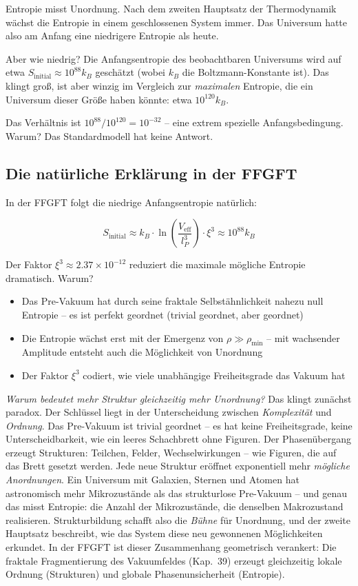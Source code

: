 	Entropie misst Unordnung. Nach dem zweiten Hauptsatz der Thermodynamik wächst die Entropie in einem geschlossenen System immer. Das Universum hatte also am Anfang eine niedrigere Entropie als heute.
	
	Aber wie niedrig? Die Anfangsentropie des beobachtbaren Universums wird auf etwa $S_{\text{initial}} \approx 10^{88} k_B$ geschätzt (wobei $k_B$ die Boltzmann-Konstante ist). Das klingt groß, ist aber winzig im Vergleich zur \textit{maximalen} Entropie, die ein Universum dieser Größe haben könnte: etwa $10^{120} k_B$.
	
	Das Verhältnis ist $10^{88}/10^{120} = 10^{-32}$ -- eine extrem spezielle Anfangsbedingung. Warum? Das Standardmodell hat keine Antwort.
	
	\subsection{Die natürliche Erklärung in der FFGFT}
	
	In der FFGFT folgt die niedrige Anfangsentropie natürlich:
	
	\begin{equation}
		S_{\text{initial}} \approx k_B \cdot \ln\left(\frac{V_{\text{eff}}}{l_P^3}\right) \cdot \xi^3 \approx 10^{88} k_B
	\end{equation}
	
	Der Faktor $\xi^3 \approx 2.37 \times 10^{-12}$ reduziert die maximale mögliche Entropie dramatisch. Warum?
	
	\begin{itemize}[leftmargin=*]
		\item Das Pre-Vakuum hat durch seine fraktale Selbstähnlichkeit nahezu null Entropie -- es ist perfekt geordnet (trivial geordnet, aber geordnet)
		\item Die Entropie wächst erst mit der Emergenz von $\rho \gg \rho_{\min}$ -- mit wachsender Amplitude entsteht auch die Möglichkeit von Unordnung
		\item Der Faktor $\xi^3$ codiert, wie viele unabhängige Freiheitsgrade das Vakuum hat
	\end{itemize}
	
	\textit{Warum bedeutet mehr Struktur gleichzeitig mehr Unordnung?} Das klingt zunächst paradox. Der Schlüssel liegt in der Unterscheidung zwischen \textit{Komplexität} und \textit{Ordnung}. Das Pre-Vakuum ist trivial geordnet -- es hat keine Freiheitsgrade, keine Unterscheidbarkeit, wie ein leeres Schachbrett ohne Figuren. Der Phasenübergang erzeugt Strukturen: Teilchen, Felder, Wechselwirkungen -- wie Figuren, die auf das Brett gesetzt werden. Jede neue Struktur eröffnet exponentiell mehr \textit{mögliche Anordnungen}. Ein Universum mit Galaxien, Sternen und Atomen hat astronomisch mehr Mikrozustände als das strukturlose Pre-Vakuum -- und genau das misst Entropie: die Anzahl der Mikrozustände, die denselben Makrozustand realisieren. Strukturbildung schafft also die \textit{Bühne} für Unordnung, und der zweite Hauptsatz beschreibt, wie das System diese neu gewonnenen Möglichkeiten erkundet. In der FFGFT ist dieser Zusammenhang geometrisch verankert: Die fraktale Fragmentierung des Vakuumfeldes (Kap.~39) erzeugt gleichzeitig lokale Ordnung (Strukturen) und globale Phasenunsicherheit (Entropie).

